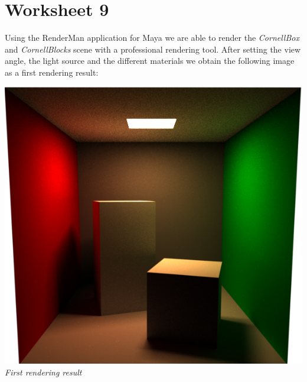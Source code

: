 \documentclass[a4,12pt]{article}
\begin{document}
	\section{Worksheet 9}
	Using the RenderMan application for Maya we are able to render the \textit{CornellBox} and \textit{CornellBlocks} scene with a professional rendering tool. After setting the view angle, the light source and the different materials we obtain the following image as a first rendering result:
	\begin{center}
		\begin{minipage}[b]{0.4\linewidth}
			\begin{center}
				\includegraphics[width = \textwidth]{./Worksheet9/cornellBoxGlobalIllumC.png}\\
				\textit{First rendering result}\\
			\end{center}
		\end{minipage}
	\end{center}
	
\end{document}
